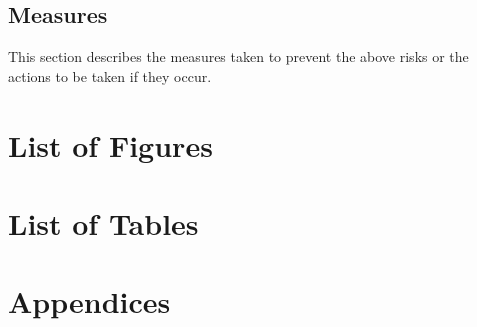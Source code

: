 \documentclass{article}
\begin{document}
\subsection{Measures}
This section describes the measures taken to prevent the above risks or the actions to be taken if they occur.


\newpage

\section{List of Figures}

\section{List of Tables}

\section{Appendices}
\end{document}
